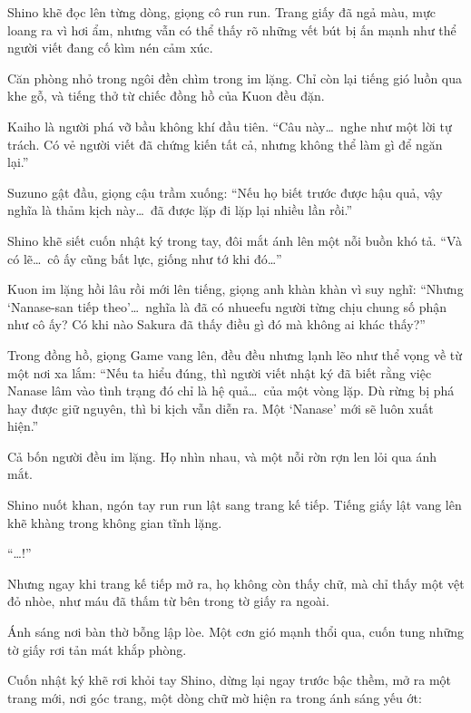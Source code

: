 \documentclass[../main.tex]{subfiles}
\begin{document}

Shino khẽ đọc lên từng dòng, giọng cô run run. Trang giấy đã ngả màu, mực loang ra vì hơi ẩm, nhưng vẫn có thể thấy rõ những vết bút bị ấn mạnh như thể người viết đang cố kìm nén cảm xúc.

Căn phòng nhỏ trong ngôi đền chìm trong im lặng. Chỉ còn lại tiếng gió luồn qua khe gỗ, và tiếng thở từ chiếc đồng hồ của Kuon đều đặn.

Kaiho là người phá vỡ bầu không khí đầu tiên. ``Câu này\dots\ nghe như một lời tự trách. Có vẻ người viết đã chứng kiến tất cả, nhưng không thể làm gì để ngăn lại.''

Suzuno gật đầu, giọng cậu trầm xuống: ``Nếu họ biết trước được hậu quả, vậy nghĩa là thảm kịch này\dots\ đã được lặp đi lặp lại nhiều lần rồi.''

Shino khẽ siết cuốn nhật ký trong tay, đôi mắt ánh lên một nỗi buồn khó tả. ``Và có lẽ\dots\ cô ấy cũng bất lực, giống như tớ khi đó\dots''

Kuon im lặng hồi lâu rồi mới lên tiếng, giọng anh khàn khàn vì suy nghĩ: ``Nhưng `Nanase-san tiếp theo'\dots\ nghĩa là đã có nhueefu người từng chịu chung số phận như cô ấy? Có khi nào Sakura đã thấy điều gì đó mà không ai khác thấy?''

Trong đồng hồ, giọng Game vang lên, đều đều nhưng lạnh lẽo như thể vọng về từ một nơi xa lắm: ``Nếu ta hiểu đúng, thì người viết nhật ký đã biết rằng việc Nanase lâm vào tình trạng đó chỉ là hệ quả\dots\ của một vòng lặp. Dù rừng bị phá hay được giữ nguyên, thì bi kịch vẫn diễn ra. Một `Nanase' mới sẽ luôn xuất hiện.''

Cả bốn người đều im lặng. Họ nhìn nhau, và một nỗi rờn rợn len lỏi qua ánh mắt.

Shino nuốt khan, ngón tay run run lật sang trang kế tiếp. Tiếng giấy lật vang lên khẽ khàng trong không gian tĩnh lặng.

``\dots!''

Nhưng ngay khi trang kế tiếp mở ra, họ không còn thấy chữ, mà chỉ thấy một vệt đỏ nhòe, như máu đã thấm từ bên trong tờ giấy ra ngoài.

Ánh sáng nơi bàn thờ bỗng lập lòe. Một cơn gió mạnh thổi qua, cuốn tung những tờ giấy rơi tản mát khắp phòng.

Cuốn nhật ký khẽ rơi khỏi tay Shino, dừng lại ngay trước bậc thềm, mở ra một trang mới, nơi góc trang, một dòng chữ mờ hiện ra trong ánh sáng yếu ớt:

\end{document}
